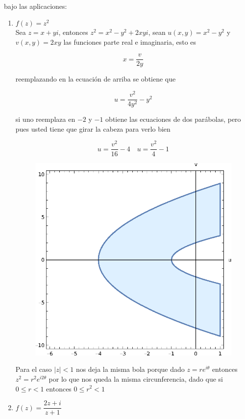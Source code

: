\documentclass[11pt]{article}
\begin{document}
\begin{enumerate}
    bajo las aplicaciones:
    \begin{enumerate}
        \item \( f(z) = z^2 \)\\

        Sea $z=x+yi$, entonces $z^2=x^2-y^2+2xyi$, sean $u(x,y)=x^2-y^2$ y $v(x,y)=2xy$ las funciones parte real e imaginaria, esto es

        $$x=\frac{v}{2y}$$ 

        reemplazando en la ecuación de arriba se obtiene que 

        $$u=\frac{v^2}{4y^2}-y^2$$

        si uno reemplaza en $-2$ y $-1$ obtiene las ecuaciones de dos parábolas, pero pues usted tiene que girar la cabeza  para verlo bien

        $$u=\frac{v^2}{16}-4\quad u=\frac{v^2}{4}-1$$

       \begin{figure}[H]
        \centering
        \includegraphics[scale=0.86]{Graphics/S1.eps}
        \end{figure}     

        Para el caso $|z|<1$ nos deja la misma bola porque dado $z=re^{i\theta}$ entonces $z^2=r^2e^{i2\theta}$ por lo que nos queda la misma circunferencia, dado que si $0\leq r<1$ entonces $0\leq r^2<1$
        \item \( f(z) = \dfrac{2z + i}{z + 1} \)\\


\end{enumerate}
\end{enumerate}
\end{document}
